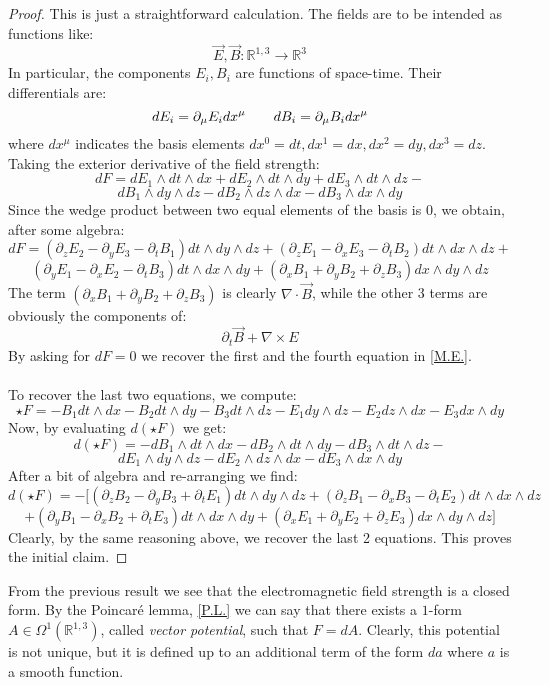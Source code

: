 \documentclass[12pt,a4paper]{report}
\theoremstyle{definition}
\theoremstyle{Theorem}
\theoremstyle{definition}
\theoremstyle{definition}
\begin{document}
	\begin{proof}
		This is just a straightforward calculation. The fields are to be intended as functions like:
		$$\vec{E},\vec{B}:\mathbb{R}^{1,3}\rightarrow\mathbb{R}^3$$
		In particular, the components $E_i,B_i$ are functions of space-time. Their differentials are:
		$$dE_i=\partial_\mu E_idx^\mu\hspace{20 pt}dB_i=\partial_\mu B_idx^\mu$$
		where $dx^\mu$ indicates the basis elements $dx^0=dt,dx^1=dx,dx^2=dy,dx^3=dz$. Taking the exterior derivative of the field strength:
		$$dF=dE_1\wedge dt\wedge dx+dE_2\wedge dt\wedge dy+dE_3\wedge dt\wedge dz-$$
		$$dB_1\wedge dy\wedge dz-dB_2\wedge dz\wedge dx-dB_3\wedge dx\wedge dy$$
		Since the wedge product between two equal elements of the basis is 0, we obtain, after some algebra:
		$$dF=(\partial_z E_2-\partial_y E_3-\partial_t B_1)dt\wedge dy\wedge dz+(\partial_z E_1-\partial_x E_3-\partial_t B_2)dt\wedge dx\wedge dz+$$
		$$(\partial_y E_1-\partial_x E_2-\partial_t B_3)dt\wedge dx\wedge dy+ (\partial_x B_1+ \partial_y B_2+\partial_z B_3)dx\wedge dy\wedge dz$$
		The term $(\partial_x B_1+ \partial_y B_2+\partial_z B_3)$ is clearly $\nabla\cdot \vec{B}$, while the other 3 terms are obviously the components of:
		$$\partial_t\vec{B}+\nabla\times E$$
		By asking for $dF=0$ we recover the first and the fourth equation in \ref*{M.E.}.\\
		\\
		To recover the last two equations, we compute: 
		$$\star F=-B_1 dt\wedge dx-B_2dt\wedge dy-B_3 dt\wedge dz-E_1 dy\wedge dz-E_2 dz\wedge dx-E_3 dx\wedge dy$$
		Now, by evaluating $d(\star F)$ we get:
		$$d(\star F)=-dB_1\wedge dt\wedge dx-dB_2\wedge dt\wedge dy-dB_3\wedge dt\wedge dz-$$
		$$dE_1\wedge dy\wedge dz-dE_2\wedge dz\wedge dx-dE_3\wedge dx\wedge dy$$
		After a bit of algebra and re-arranging we find:
		$$d(\star F)=-\bigg[(\partial_z B_2-\partial_y B_3+\partial_t E_1)dt\wedge dy\wedge dz+
		(\partial_z B_1-\partial_x B_3-\partial_t E_2)dt\wedge dx\wedge dz
		$$
		$$+(\partial_y B_1-\partial_x B_2+\partial_t E_3)dt\wedge dx\wedge dy+(\partial_x E_1+\partial_y E_2+\partial_z E_3)dx\wedge dy\wedge dz\bigg]$$
		Clearly, by the same reasoning above, we recover the last 2 equations. This proves the initial claim.
	\end{proof}
	From the previous result we see that the electromagnetic field strength is a closed form. By the Poincaré lemma, \ref{P.L.} we can say that there exists a $1$-form $A\in\Omega^1(\mathbb{R}^{1,3})$, called \textit{vector potential}, such that $F=dA$. Clearly, this potential is not unique, but it is defined up to an additional term of the form $da$ where $a$ is a smooth function.\\
\end{document}
